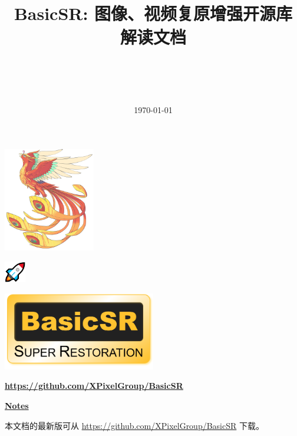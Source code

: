 \documentclass[a4paper, 12pt, oneside]{memoir}
\title{
	\vspace{4cm}
	\normalfont \normalsize
	\horrule{0.5pt} \\[0.4cm]
	\huge \begin{CJK}{UTF8}{gbsn} BasicSR: 图像、视频复原增强开源库
		\\ 解读文档\end{CJK}
	\horrule{2pt} \\[0.5cm]
}
\date{\normalsize\today}
\begin{document}
	\maketitle
	\thispagestyle{empty}

	\vspace{-14.5cm}
	\begin{adjustwidth}{0.5cm}{}
		\hspace{5.5cm}
		\includegraphics[width=0.3\textwidth]{figures/xpixel-logo.jpg}
	\end{adjustwidth}
	\vspace{1.2cm}
	\begin{adjustwidth}{0.5cm}{}
		\includegraphics[width=0.07\textwidth]{figures/rocket_logo.png}
	\end{adjustwidth}
	\vspace{5cm}

	\begin{center}
		\includegraphics[width=0.5\textwidth]{figures/basicsr_logo.png}
	\end{center}
	\begin{center}
		\underline{\textbf{\url{https://github.com/XPixelGroup/BasicSR}}}
	\end{center}

	\vspace{2.2cm}
	\begin{center}
		\textcolor{ChadBlue}{\underline{\textbf{Notes}}}
	\end{center}
	\vspace{0.5cm}
	\begin{CJK}{UTF8}{gbsn}

		本文档的最新版可从 \url{https://github.com/XPixelGroup/BasicSR} 下载。
	\end{CJK}
\end{document}
